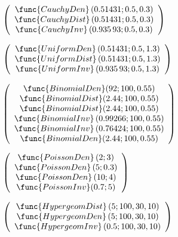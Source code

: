 \documentclass{article}
\begin{document}
$\left( 
\begin{array}{c}
\func{CauchyDen}\left( 0.51431;0.5,0.3\right)  \\ 
\func{CauchyDist}\left( 0.51431;0.5,0.3\right)  \\ 
\func{CauchyInv}\left( 0.935\,93;0.5,0.3\right) 
\end{array}%
\right) $

$\left( 
\begin{array}{c}
\func{UniformDen}\left( 0.51431;0.5,1.3\right)  \\ 
\func{UniformDist}\left( 0.51431;0.5,1.3\right)  \\ 
\func{UniformInv}\left( 0.935\,93;0.5,1.3\right) 
\end{array}%
\right) $

$\left( 
\begin{array}{c}
\func{BinomialDen}(92;100,0.55) \\ 
\func{BinomialDist}(2.44;100,0.55) \\ 
\func{BinomialDist}(2.44;100,0.55) \\ 
\func{BinomialInv}\left( 0.99266;100,0.55\right)  \\ 
\func{BinomialInv}\left( 0.76424;100,0.55\right)  \\ 
\func{BinomialDen}(2.44;100,0.55)%
\end{array}%
\right) $

$\left( 
\begin{array}{c}
\func{PoissonDen}\left( 2;3\right)  \\ 
\func{PoissonDen}\left( 5;0.3\right)  \\ 
\func{PoissonDen}\left( 10;4\right)  \\ 
\func{PoissonInv}(0.7;5)%
\end{array}%
\right) $

$\left( 
\begin{array}{c}
\func{HypergeomDist}\left( 5;100,30,10\right)  \\ 
\func{HypergeomDen}\left( 5;100,30,10\right)  \\ 
\func{HypergeomInv}\left( 0.5;100,30,10\right) 
\end{array}%
\right) $
\end{document}
